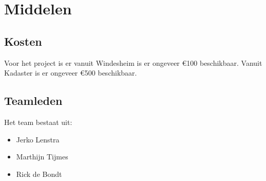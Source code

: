 \section{Middelen}
\subsection{Kosten}
Voor het project is er vanuit Windesheim is er ongeveer \euro{100}
beschikbaar. Vanuit Kadaster is er ongeveer \euro{500} beschikbaar.
\subsection{Teamleden}
Het team bestaat uit:

\begin{itemize}
        \item Jerko Lenstra
        \item Marthijn Tijmes
        \item Rick de Bondt
\end{itemize}
